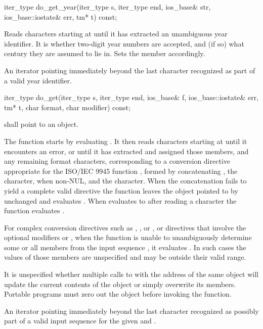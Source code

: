 %
\begin{itemdecl}
iter_type do_get_year(iter_type s, iter_type end, ios_base& str,
                      ios_base::iostate& err, tm* t) const;
\end{itemdecl}

\begin{itemdescr}
\pnum
\effects
Reads characters starting at 
until it has extracted an unambiguous year identifier.
It is
 whether
two-digit year numbers are accepted,
and (if so) what century they are assumed to lie in.
Sets the
member accordingly.

\pnum
\returns
An iterator pointing immediately beyond the last character recognized
as part of a valid year identifier.
\end{itemdescr}

%
\begin{itemdecl}
iter_type do_get(iter_type s, iter_type end, ios_base& f,
    ios_base::iostate& err, tm* t, char format, char modifier) const;
\end{itemdecl}

\begin{itemdescr}
\pnum
\requires
{} shall point to an object.

\pnum
\effects The function starts by evaluating
. It
then reads characters starting at  until it encounters an error, or
until it has extracted and assigned those  members, and any
remaining format characters, corresponding to a conversion directive
appropriate for the ISO/IEC 9945 function , formed by
concatenating , the  character,
when non-NUL, and the 
character. When the concatenation fails to yield a complete valid
directive the function leaves the object pointed to by  unchanged and
evaluates . When 
evaluates to  after reading a character the function evaluates
.

\pnum
For complex conversion directives such as ,
, or , or directives
that involve the optional modifiers  or ,
when the function is unable
to unambiguously determine some or all  members from the input
sequence , it evaluates .
In such cases the values of those  members are unspecified
and may be outside their valid range.

\pnum
\remarks It is unspecified whether multiple calls to
 with the
address of the same  object will update the current contents of
the object or simply overwrite its members. Portable programs must zero
out the object before invoking the function.

\pnum
\returns An iterator pointing immediately beyond the last character
recognized as possibly part of a valid input sequence for the given
 and .
\end{itemdescr}

